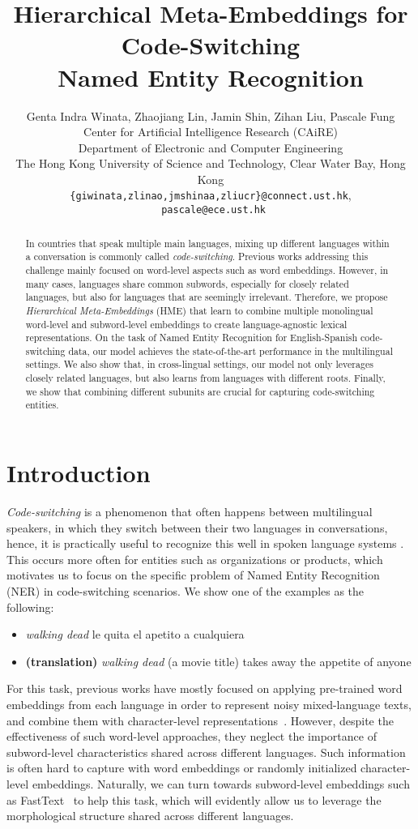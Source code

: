 \documentclass[11pt,a4paper]{article}
\title{Hierarchical Meta-Embeddings for Code-Switching \\Named Entity Recognition}
\author{Genta Indra Winata, Zhaojiang Lin, Jamin Shin, Zihan Liu, Pascale Fung \\
Center for Artificial Intelligence Research (CAiRE)\\
  Department of Electronic and Computer Engineering\\
  The Hong Kong University of Science and Technology, Clear Water Bay, Hong Kong\\
  \texttt{\{giwinata,zlinao,jmshinaa,zliucr\}@connect.ust.hk},\\ \texttt{ pascale@ece.ust.hk}}
\date{}
\begin{document}
\maketitle
\begin{abstract}
  In countries that speak multiple main languages, mixing up different languages within a conversation is commonly called \textit{code-switching}. Previous works addressing this challenge mainly focused on word-level aspects such as word embeddings. However, in many cases, languages share common subwords, especially for closely related languages, but also for languages that are seemingly irrelevant. Therefore, we propose \textit{Hierarchical Meta-Embeddings} (HME) that learn to combine multiple monolingual word-level and subword-level embeddings to create language-agnostic lexical representations. On the task of Named Entity Recognition for English-Spanish code-switching data, our model achieves the state-of-the-art performance in the multilingual settings. We also show that, in cross-lingual settings, our model not only leverages closely related languages, but also learns from languages with different roots. Finally, we show that combining different subunits are crucial for capturing code-switching entities. 


\end{abstract}

\section{Introduction}


\textit{Code-switching} is a phenomenon that often happens between multilingual speakers, in which they switch between their two languages in conversations, hence, it is practically useful to recognize this well in spoken language systems \cite{winata2018code}. This occurs more often for entities such as organizations or products, which motivates us to focus on the specific problem of Named Entity Recognition (NER) in code-switching scenarios. We show one of the examples as the following:
\begin{itemize}
  \item[] \textit{walking dead} le quita el apetito a cualquiera
  \item[] \textbf{(translation)} \textit{walking dead} (a movie title) takes away the appetite of anyone
\end{itemize}

For this task, previous works have mostly focused on applying pre-trained word embeddings from each language in order to represent noisy mixed-language texts, and combine them with character-level representations~\cite{trivedi2018iit,wang2018code,winata2018bilingual}.
However, despite the effectiveness of such word-level approaches, they neglect the importance of subword-level characteristics shared across different languages. Such information is often hard to capture with word embeddings or randomly initialized character-level embeddings. Naturally, we can turn towards subword-level embeddings such as FastText~\cite{grave2018learning} to help this task, which will evidently allow us to leverage the morphological structure shared across different languages.
\end{document}
